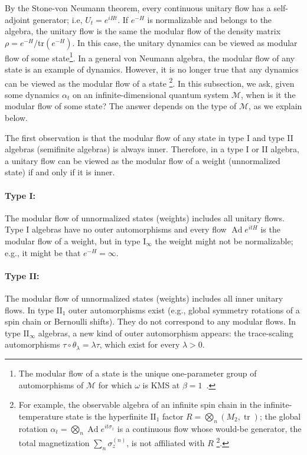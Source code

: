\documentclass[a4paper,11pt]{article}
\theoremstyle{definition}
\newcommand{\mM}{\mathcal{M}}
\newcommand{\tr}{\text{tr}}
\begin{document}
By the Stone-von Neumann theorem, every continuous unitary flow has a self-adjoint generator; i.e, $U_t=e^{i H t}$. If $e^{-H}$ is normalizable and belongs to the algebra, the unitary flow is the same the modular flow of the density matrix $\rho=e^{-H}/\tr(e^{-H})$. In this case, the unitary dynamics can be viewed as modular flow of some state\footnote{The modular flow of a state is the unique one-parameter group of automorphisms of $\mM$ for which $\omega$ is KMS at $\beta=1$~\cite{Takesaki1970}.}. In a general von Neumann algebra, the modular flow of any state is an example of dynamics. However, it is no longer true that any dynamics can be viewed as the modular flow of a state \footnote{For example, the observable algebra of an infinite spin chain in the infinite-temperature state is the hyperfinite $\mathrm{II}_1$ factor $R=\bigotimes_n(M_2,\operatorname{tr})$; the global rotation $\alpha_t=\bigotimes_n\operatorname{Ad}e^{it\sigma_z}$ is a continuous flow whose would-be generator, the total magnetization $\sum_n\sigma_z^{(n)}$, is not affiliated with $R$ \footnote{This flow is outer for all $t\notin\pi\mathbb Z$, since $\bigotimes_n\operatorname{Ad}u_n$ is inner iff $\sum_n(1-|\operatorname{tr}u_n|)<\infty$ and here $|\operatorname{tr}e^{it\sigma_z}|=|\cos t|$.}.}. In this subsection, we ask, given some dynamics $\alpha_t$ on an infinite-dimensional quantum system $\mM$, when is it the modular flow of some state? The answer depends on the type of $\mM$, as we explain below.

The first observation is that the modular flow of any state in type I and type II algebras (semifinite algebras) is always inner. 
Therefore, in a type I or II algebra, a unitary flow can be viewed as the modular flow of a weight (unnormalized state) if and only if it is inner. 

\paragraph{Type I:} The modular flow of unnormalized states (weights) includes all unitary flows.
Type I algebras have no outer automorphisms and every flow $\operatorname{Ad}e^{itH}$ is the modular flow of a weight, but in type I$_\infty$ the weight might not be normalizable; e.g., it might be that $e^{-H}=\infty$.

\paragraph{Type II:} The modular flow of unnormalized states (weights) includes all inner unitary flows. 
In type $\mathrm{II}_1$ outer automorphisms exist (e.g., global symmetry rotations of a spin chain or Bernoulli shifts). They do not correspond to any modular flows.
In type $\mathrm{II}_\infty$ algebras, a new kind of outer automorphism appears: the trace-scaling automorphisms $\tau\circ\theta_\lambda=\lambda\tau$, which exist for every $\lambda>0$.
\end{document}
